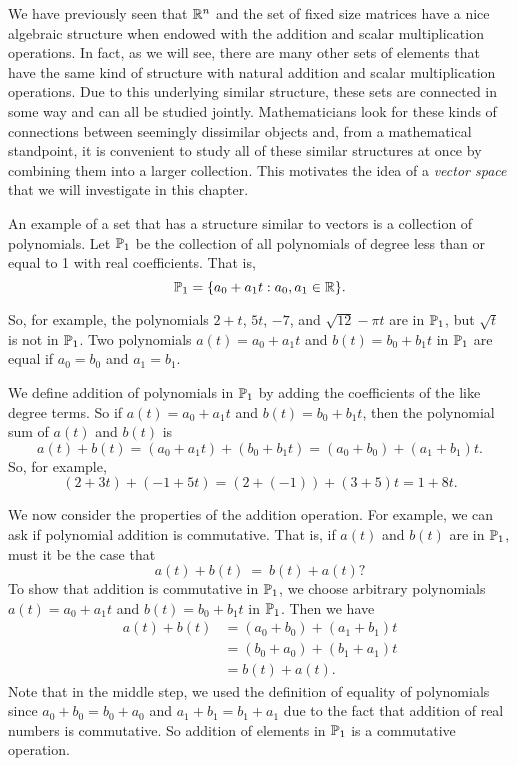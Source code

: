 \label{sec:vec_space_intro}

We have previously seen that $\mathbb{R}^n$ and the set of fixed size matrices have a nice algebraic structure when endowed with the addition and scalar multiplication operations. In fact, as we will see, there are many other sets of elements that have the same kind of structure with natural addition and scalar multiplication operations. Due to this underlying similar structure, these sets are connected in some way and can all be studied jointly. Mathematicians look for these kinds of connections between seemingly dissimilar objects and, from a mathematical standpoint, it is convenient to study all of these similar structures at once by combining them into a larger collection. This motivates the idea of a \emph{vector space} that we will investigate in this chapter.

An example of a set that has a structure similar to vectors is a collection of polynomials. Let $\mathbb{P}_1$ be the collection of all polynomials of degree less than or equal to 1 with real coefficients. That is,
\[\mathbb{P}_1 = \{ a_0 + a_1t : a_0, a_1 \in \mathbb{R}\}.\]

So, for example, the polynomials $2+t$, $5t$, $-7$, and $\sqrt{12}-\pi t$ are in $\mathbb{P}_1$, but $\sqrt{t}$ is not in $\mathbb{P}_1$. Two polynomials $a(t)=a_0+a_1t$ and $b(t)=b_0+b_1t$ in $\mathbb{P}_1$ are equal if $a_0=b_0$ and $a_1=b_1$. 

We define addition of polynomials in $\mathbb{P}_1$ by adding the coefficients of the like degree terms. So if $a(t) = a_0+a_1t$ and $b(t) = b_0+b_1t$, then the polynomial sum of $a(t)$ and $b(t)$ is 
\[a(t)+b(t) = (a_0+a_1t) + (b_0+b_1t) = (a_0+b_0) + (a_1+b_1)t.\]
So, for example,
\[ (2+3t)+(-1+5t) = (2+(-1)) + (3+5)t = 1+8 t . \]

We now consider the properties of the addition operation. For example, we can ask if polynomial addition is commutative. That is, if $a(t)$ and $b(t)$ are in $\mathbb{P}_1$, must it be the case that 
\[a(t)+b(t)~=~b(t)+a(t)?\]
To show that addition is commutative in $\mathbb{P}_1$, we choose arbitrary polynomials $a(t) = a_0 + a_1t$ and $b(t) = b_0 + b_1t$ in $\mathbb{P}_1$. Then we have 
\begin{align*}
a(t)+b(t) &= (a_0+b_0) + (a_1+b_1)t \\
	&= (b_0+a_0) + (b_1+a_1)t \\
	&= b(t)+a(t).
\end{align*}
Note that in the middle step, we used the definition of equality of polynomials since $a_0+b_0=b_0+a_0$ and $a_1+b_1=b_1+a_1$ due to the fact that addition of real numbers is commutative. So addition of elements in $\mathbb{P}_1$ is a commutative operation. 



